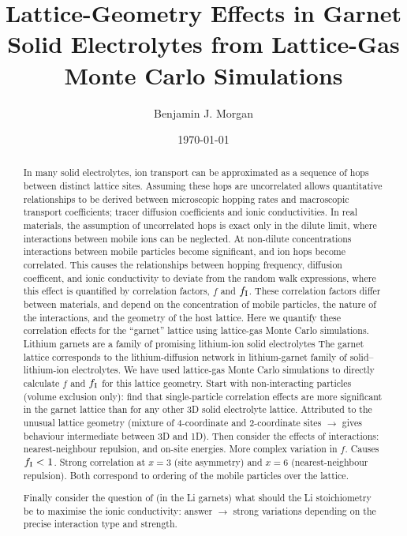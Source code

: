 \documentclass[aps,prb,twocolumn,superscriptaddress,reprint]{revtex4-1}
\begin{document}
\title{Lattice-Geometry Effects in Garnet Solid Electrolytes from Lattice-Gas Monte Carlo Simulations}
\author{Benjamin J. Morgan}

\date{\today}

\begin{abstract}
In many solid electrolytes, ion transport can be approximated as a sequence of hops between distinct lattice sites. Assuming these hops are uncorrelated allows quantitative relationships to be derived between microscopic hopping rates and macroscopic transport coefficients; tracer diffusion coefficients and ionic conductivities. In real materials, the assumption of uncorrelated hops is exact only in the dilute limit, where interactions between mobile ions can be neglected. At non-dilute concentrations interactions between mobile particles become significant, and ion hops become correlated. This causes the relationships between hopping frequency, diffusion coefficent, and ionic conductivity to deviate from the random walk expressions, where this effect is quantified by correlation factors, $f$ and $f_{\mathrm{I}}$. These correlation factors differ between materials, and depend on the concentration of mobile particles, the nature of the interactions, and the geometry of the host lattice. 
Here we quantify these correlation effects for the ``garnet'' lattice using lattice-gas Monte Carlo simulations. Lithium garnets are a family of promising lithium-ion solid electrolytes The garnet lattice corresponds to the lithium-diffusion network in lithium-garnet family of  solid--lithium-ion electrolytes. We have used lattice-gas Monte Carlo simulations to directly calculate $f$ and $f_{\mathrm{I}}$ for this lattice geometry. Start with non-interacting particles (volume exclusion only): find that single-particle correlation effects are more significant in the garnet lattice than for any other 3D solid electrolyte lattice. Attributed to the unusual lattice geometry (mixture of 4-coordinate and 2-coordinate sites $\to$ gives behaviour intermediate between 3D and 1D). Then consider the effects of interactions: nearest-neighbour repulsion, and on-site energies. More complex variation in $f$. Causes $f_{\mathrm{I}}<1$. Strong correlation at $x=3$ (site asymmetry) and $x=6$ (nearest-neighbour repulsion). Both correspond to ordering of the mobile particles over the lattice. 

Finally consider the question of (in the Li garnets) what should the Li stoichiometry be to maximise the ionic conductivity: answer $\to$ strong variations depending on the precise interaction type and strength.

\end{abstract}
\end{document}
